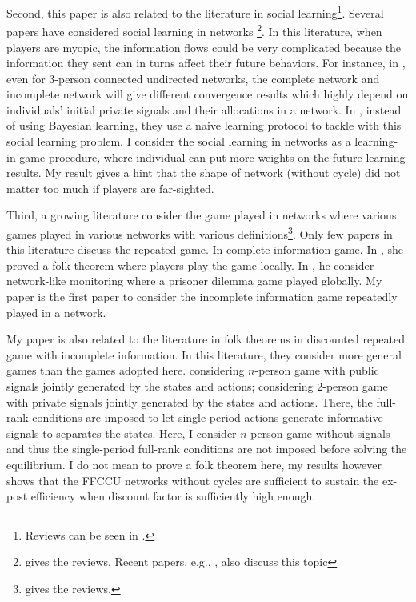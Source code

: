 \documentclass[12pt,letter]{article}
\theoremstyle{definition}
\theoremstyle{remark}
\theoremstyle{claim}
\begin{document}
Second, this paper is also related to the literature in social learning\footnote{Reviews can be seen in \citep{Bikhchandani1998} \citep{Cao2001}.}. Several papers have considered social learning in networks \footnote{\citep{Goyal2012} gives the reviews. Recent papers, e.g., \citep{Acemoglu2011}\citep{Chatterjee2011}, also discuss this topic}. In this literature, when players are myopic, the information flows could be very complicated because the information they sent can in turns affect their future behaviors. For instance, in \citep{RePEc:eee:gamebe:v:45:y:2003:i:2:p:329-346},  even for 3-person connected undirected networks, the complete network and incomplete network will give different convergence results which highly depend on individuals' initial private signals and their allocations in a network. In \citep{Golub2010}, instead of using Bayesian learning, they use a naive learning protocol to tackle with this social learning problem. I consider the social learning in networks as a learning-in-game procedure, where individual can put more weights on the future learning results. My result gives a hint that the shape of network (without cycle) did not matter too much if players are far-sighted.

Third, a growing literature consider the game played in networks where various games played in various networks with various definitions\footnote{\citep{Jackson2008}\citep{Goyal2012} gives the reviews.}. Only few papers in this literature discuss the repeated game. In complete information game. In \citep{Laclau2012}, she proved a folk theorem where players play the game locally. In \citep{Wolitzky2013} \citep{Wolitzky2014}, he consider network-like monitoring where a prisoner dilemma game played globally. My paper is the first paper to consider the incomplete information game repeatedly played in a network. 

My paper is also related to the literature in folk theorems in discounted repeated game with incomplete information. In this literature, they consider more general games than the games adopted here. \citep{Fudenberg2010} \citep{Fudenberg2011} \citep{Wiseman2012} considering $n$-person game with public signals jointly generated by the states and actions; \citep{Yamamoto2014} considering $2$-person game with private signals jointly generated by the states and actions. There, the full-rank conditions are imposed to let single-period actions generate informative signals to separates the states. Here, I consider $n$-person game without signals and thus the single-period full-rank conditions are not imposed before solving the equilibrium.  I do not mean to prove a folk theorem here, my results however shows that the FFCCU networks without cycles are sufficient to sustain the ex-post efficiency when discount factor is sufficiently high enough. 
\end{document}

